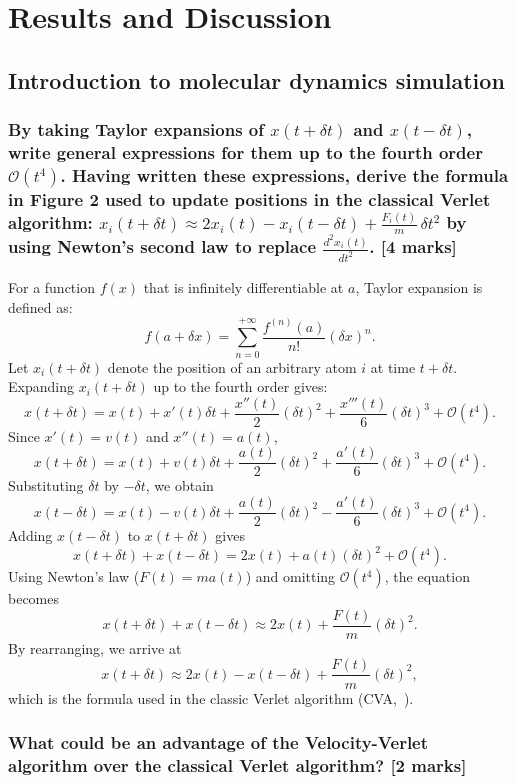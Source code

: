 \documentclass[a4paper,10pt,twocolumn]{article}
\begin{document}
\section{Results and Discussion} %

\subsection{Introduction to molecular dynamics simulation}
\subsubsection*{By taking Taylor expansions of $x(t+\delta t)$ and $x(t-\delta t)$, write general expressions for them up to the fourth order $\mathcal{O}(t^4)$. Having written these expressions, derive the formula in Figure 2 used to update positions in the classical Verlet algorithm: $x_i(t+\delta t)\approx2x_i(t)-x_i(t-\delta t)+\frac{F_i(t)}{m}\,\delta t^2$ by using Newton’s second law to replace $\frac{d^2 x_i(t)}{dt^2}$. [4 marks]}

For a function $f(x)$ that is infinitely differentiable at $a$, Taylor expansion is defined as:
\[
f(a+\delta x)=\sum_{n=0}^{+\infty}\frac{f^{(n)}(a)}{n!}(\delta x)^n.
\]
Let $x_i(t+\delta t)$ denote the position of an arbitrary atom $i$ at time $t+\delta t$. Expanding $x_i(t+\delta t)$ up to the fourth order gives:
\[
x(t+\delta t)=x(t)+x'(t)\delta t+\frac{x''(t)}{2}(\delta t)^2+\frac{x'''(t)}{6}(\delta t)^3+\mathcal{O}(t^4).
\]
Since $x'(t)=v(t)$ and $x''(t)=a(t)$,
\[
x(t+\delta t)=x(t)+v(t)\delta t+\frac{a(t)}{2}(\delta t)^2+\frac{a'(t)}{6}(\delta t)^3+\mathcal{O}(t^4).
\]
Substituting $\delta t$ by $-\delta t$, we obtain
\[
x(t-\delta t)=x(t)-v(t)\delta t+\frac{a(t)}{2}(\delta t)^2-\frac{a'(t)}{6}(\delta t)^3+\mathcal{O}(t^4).
\]
Adding $x(t-\delta t)$ to $x(t+\delta t)$ gives
\[
x(t+\delta t)+x(t-\delta t)=2x(t)+a(t)(\delta t)^2+\mathcal{O}(t^4).
\]
Using Newton's law ($F(t)=ma(t)$) and omitting $\mathcal{O}(t^4)$, the equation becomes
\[
x(t+\delta t)+x(t-\delta t)\approx2x(t)+\frac{F(t)}{m}(\delta t)^2.
\]
By rearranging, we arrive at
\[
x(t+\delta t)\approx 2x(t)-x(t-\delta t)+\frac{F(t)}{m}(\delta t)^2,
\]
which is the formula used in the classic Verlet algorithm (CVA,~\cite{verlet1967computer}).

\subsubsection*{What could be an advantage of the Velocity-Verlet algorithm over the classical Verlet algorithm? [2 marks]}
\end{document}
